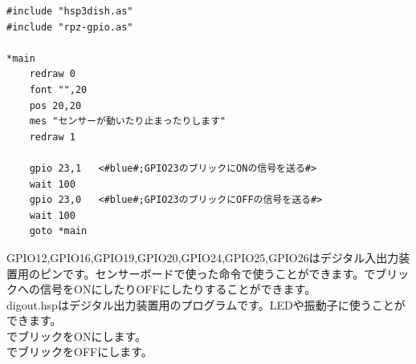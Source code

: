 \begin{lstlisting}[caption=digout.hsp,label=digout.hsp]
#include "hsp3dish.as"
#include "rpz-gpio.as"

*main
	redraw 0
	font "",20
	pos 20,20
	mes "センサーが動いたり止まったりします"
	redraw 1

	gpio 23,1	<#blue#;GPIO23のブリックにONの信号を送る#>
	wait 100
	gpio 23,0	<#blue#;GPIO23のブリックにOFFの信号を送る#>
	wait 100
	goto *main
\end{lstlisting}

GPIO12,GPIO16,GPIO19,GPIO20,GPIO24,GPIO25,GPIO26はデジタル入出力装置用のピンです。センサーボードで使った命令で使うことができます。でブリックへの信号をONにしたりOFFにしたりすることができます。\\

digout.hspはデジタル出力装置用のプログラムです。LEDや振動子に使うことができます。\\
でブリックをONにします。\\
でブリックをOFFにします。\\

\begin{tcolorbox}[title=\useOmetoi]
\begin{enumerate}
\end{enumerate}
\end{tcolorbox}
\begin{tcolorbox}[title=\useOmetoi]
\begin{enumerate}
\end{enumerate}
\end{tcolorbox}

